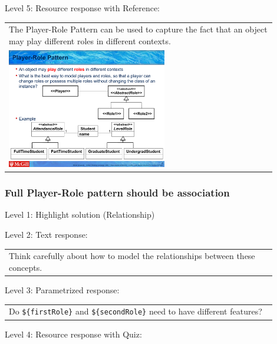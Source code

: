 \noindent Level 5: Resource response with Reference: \medskip

\begin{tabular}{|p{0.9\linewidth}}
The Player-Role Pattern can be used to capture the fact that an object may play different roles
in different contexts.

\\
\includegraphics[width=0.6\textwidth]{images/player_role.png}
\end{tabular} \medskip


\subsubsection{Full Player-Role pattern should be association}

\noindent Level 1: Highlight solution (Relationship) \medskip

\noindent Level 2: Text response: \medskip

\begin{tabular}{|p{0.9\linewidth}}
Think carefully about how to model the relationships between these concepts.
\end{tabular} \medskip

\noindent Level 3: Parametrized response: \medskip

\begin{tabular}{|p{0.9\linewidth}}
Do \verb|${firstRole}| and \verb|${secondRole}| need to have different features?
\end{tabular} \medskip

\noindent Level 4: Resource response with Quiz: \medskip


